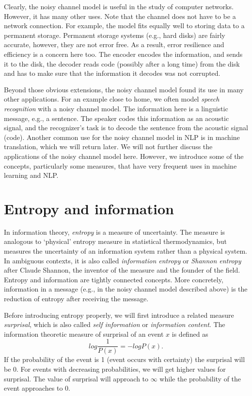 Clearly, the noisy channel model is useful in the study of computer networks.
However, it has many other uses.
Note that the channel does not have to be a network connection.
For example,
the model fits equally well to storing data to a permanent storage.
Permanent storage systems (e.g., hard disks) are fairly accurate,
however, they are not error free.
As a result,
error resilience and efficiency is a concern here too.
The encoder encodes the information,
and sends it to the disk,
the decoder reads code (possibly after a long time) from the disk and
has to make sure that the information it decodes was not corrupted.

Beyond those obvious extensions,
the noisy channel model found its use in many other applications.
For an example close to home,
we often model \emph{speech recognition} with a noisy channel model.
The information here is a linguistic message,
e.g., a sentence.
The speaker codes this information as an acoustic signal,
and the recognizer's task is to decode the sentence
from the acoustic signal (code).
Another common use for the noisy channel model in NLP is
in machine translation, which we will return later.
We will not further discuss
the applications of the noisy channel model here.
However,
we introduce some of the concepts, particularly some measures,
that have very frequent uses in machine learning and NLP.

\section{Entropy and information}

In information theory,
\emph{entropy} is a measure of uncertainty.
The measure is analogous to `physical' entropy measure
in statistical thermodynamics,
but measures the uncertainty of
an information system rather than a physical system.
In ambiguous contexts, it is also called \emph{information entropy} or 
\emph{Shannon entropy} after Claude Shannon,
the inventor of the measure and the founder of the field.
Entropy and information are tightly connected concepts.
More concretely,
information in a message
(e.g., in the noisy channel model described above)
is the reduction of entropy after receiving the message.

Before introducing entropy properly,
we will first introduce a related measure \emph{surprisal},
which is also called \emph{self information}
or \emph{information content}.
The information theoretic measure of surprisal of an event $x$ is defined as
\begin{equation}\label{eq:surprisal}
  log \frac{1}{P(x)} = - log P(x) .
\end{equation}
If the probability of the event is \num{1}
(event occurs with certainty)
the surprisal will be \num{0}.
For events with decreasing probabilities,
we will get higher values for surprisal.
The value of surprisal will approach to $\infty$
while the probability of the event approaches to \num{0}.

